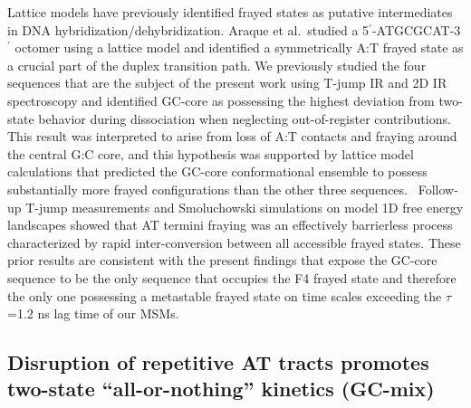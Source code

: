 \documentclass[journal=jpcbfk,manuscript=article]{achemso}
\begin{document}
Lattice models have previously identified frayed states as putative intermediates in DNA hybridization/dehybridization.\citep{Araque2016LatticeCooperativity, Phys2019,Sanstead2016} Araque et al.\ studied a 5$^\prime$-ATGCGCAT-3$^\prime$ octomer using a lattice model and identified a symmetrically A:T frayed state as a crucial part of the duplex transition path.\citep{Araque2016LatticeCooperativity} We previously studied the four sequences that are the subject of the present work using T-jump IR and 2D IR spectroscopy and identified GC-core as possessing the highest deviation from two-state behavior during dissociation when neglecting out-of-register contributions.\citep{Sanstead2016} This result was interpreted to arise from loss of A:T contacts and fraying around the central G:C core, and this hypothesis was supported by lattice model calculations that predicted the GC-core conformational ensemble to possess substantially more frayed configurations than the other three sequences.~\citep{Phys2019} Follow-up T-jump measurements and Smoluchowski simulations on model 1D free energy landscapes showed that AT termini fraying was an effectively barrierless process characterized by rapid inter-conversion between all accessible frayed states.\citep{Sanstead2018DirectDehybridization} These prior results are consistent with the present findings that expose the GC-core sequence to be the only sequence that occupies the F4 frayed state and therefore the only one possessing a metastable frayed state on time scales exceeding the $\tau$=1.2 ns lag time of our MSMs.





\subsection{Disruption of repetitive AT tracts promotes two-state ``all-or-nothing'' kinetics (GC-mix)}
\end{document}
